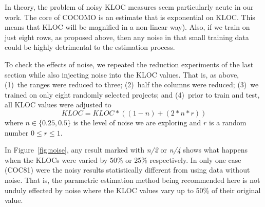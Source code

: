 \documentclass{sig-alternate}
\newcommand{\fig}[1]{Figure~\ref{fig:#1}}
\begin{document}
In theory, the  problem of noisy KLOC measures seem particularly acute in our work.
The core of COCOMO  is an estimate that is exponential on KLOC.
This means that 
 KLOC will be magnified in a non-linear way). 
Also, if we train on just eight rows, as proposed above,
then any noise in that small training data could be highly
detrimental to the estimation process.

To check the effects of noise, we repeated the reduction
experiments of the last section while also injecting
noise into the KLOC values.
That is, as above, 
(1)~the ranges were reduced to three;
(2)~half the columns were reduced;
(3)~we trained on only eight randomly selected projects; and 
(4)~prior to train and test, all KLOC values were adjusted
to
\[\mathit{KLOC} = \mathit{KLOC}*((1- n) + (2*n*r))\]
where $n \in \{0.25,0.5\}$ is the level of noise we are exploring and $r$ is a random number
$0 \le r \le 1$.

In \fig{noise}, any result
marked with {\em n/2} or {\em n/4} shows what happens
when the KLOCs were varied by 50\% or 25\% respectively.
In only one case (COC81) were the noisy results statistically
different from using data without noise. That is,
the parametric estimation method being recommended here is
not unduly effected by noise where the KLOC values
vary up to 50\% of their original value.





\newcommand{\crule}[3][darkgray]{\textcolor{#1}{\rule{#2}{#3}}}

\newcommand{\rone}{\crule{1mm}{1.95mm}}

\newcommand{\rtwo}{\crule{1mm}{1.95mm}\hspace{0.3pt}\crule{1mm}{1.95mm}}

\newcommand{\rthree}{\crule{1mm}{1.95mm}\hspace{0.3pt}\crule{1mm}{1.95mm}\hspace{0.3pt}\crule{1mm}{1.95mm}}

\newcommand{\rfour}{\crule{1mm}{1.95mm}\hspace{0.3pt}\crule{1mm}{1.95mm}\hspace{0.3pt}\crule{1mm}{1.95mm}\hspace{0.3pt}\crule{1mm}{1.95mm}}
 
\newcommand{\rfive}{\crule{1mm}{1.95mm}\hspace{0.3pt}\crule{1mm}{1.95mm}\hspace{0.3pt}\crule{1mm}{1.95mm}\hspace{0.3pt}\crule{1mm}{1.95mm}}
\end{document}
